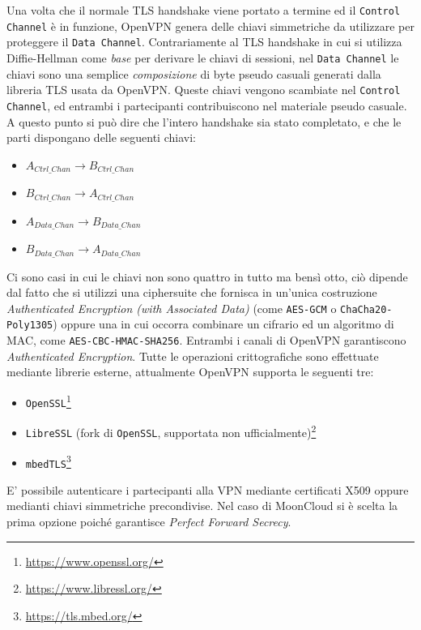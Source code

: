 Una volta che il normale TLS handshake viene portato a termine ed il \texttt{Control Channel}
è in funzione, OpenVPN genera delle chiavi simmetriche da utilizzare per proteggere
il \texttt{Data Channel}. Contrariamente al TLS handshake in cui si utilizza Diffie-Hellman
come \textit{base} per derivare le chiavi di sessioni, nel \texttt{Data Channel} le
chiavi sono una semplice \textit{composizione} di byte pseudo casuali generati
dalla libreria TLS usata da OpenVPN. Queste chiavi
vengono scambiate nel \texttt{Control Channel}, ed entrambi i partecipanti contribuiscono
nel materiale pseudo casuale.\\
A questo punto si può dire che l'intero handshake sia stato completato, e che le parti
dispongano delle seguenti chiavi:
\begin{itemize}
	\item $A_{Ctrl\_Chan} \rightarrow B_{Ctrl\_Chan}$
	\item $B_{Ctrl\_Chan} \rightarrow A_{Ctrl\_Chan}$
	\item $A_{Data\_Chan} \rightarrow B_{Data\_Chan}$
	\item $B_{Data\_Chan} \rightarrow A_{Data\_Chan}$
\end{itemize}
Ci sono casi in cui le chiavi non sono quattro in tutto ma bensì otto, ciò dipende
dal fatto che si utilizzi una ciphersuite che fornisca in un'unica costruzione \textit{Authenticated
	Encryption (with Associated Data)} (come \texttt{AES-GCM} o \texttt{ChaCha20-Poly1305})
	oppure una in cui
occorra combinare un cifrario ed un algoritmo di MAC, come \texttt{AES-CBC-HMAC-SHA256}.
Entrambi i canali di OpenVPN garantiscono \textit{Authenticated Encryption}.
Tutte le operazioni crittografiche sono effettuate mediante librerie esterne,
attualmente OpenVPN supporta le seguenti tre:
\begin{itemize}
	\item \texttt{OpenSSL}\footnote{\url{https://www.openssl.org/}}
	\item \texttt{LibreSSL} (fork di \texttt{OpenSSL}, supportata non ufficialmente)\footnote{\url{https://www.libressl.org/}}
	\item \texttt{mbedTLS}\footnote{\url{https://tls.mbed.org/}}
\end{itemize}

E' possibile autenticare i partecipanti alla VPN mediante
certificati X509 oppure medianti chiavi simmetriche precondivise. Nel caso di MoonCloud
si è scelta la prima opzione poiché garantisce \textit{Perfect Forward Secrecy}.


